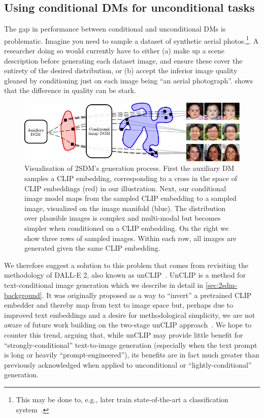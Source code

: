 \subsection{Using conditional DMs for unconditional tasks} \label{sec:2sdm-2sdm-method}

The gap in performance between conditional and unconditional DMs is problematic. Imagine you need to sample a dataset of synthetic aerial photos.\footnote{ This may be done to, e.g., later train state-of-the-art a classification system~\citep{azizi2023synthetic}.}. A researcher doing so would currently have to either (a) make up a scene description before generating each dataset image, and ensure these cover the entirety of the desired distribution, or (b) accept the inferior image quality gleaned by conditioning just on each image being ``an aerial photograph''.   shows that the difference in quality can be stark.

\begin{figure}[t]
    \centering
    \includegraphics[width=\textwidth]{figs/2sdm/vcdm-diagram.pdf}
    \caption{Visualisation of 2SDM's generation process. First the auxiliary DM samples a CLIP embedding, corresponding to a cross in the space of CLIP embeddings (red) in our illustration. Next, our conditional image model maps from the sampled CLIP embedding to a sampled image, visualized on the image manifold (blue). The distribution over plausible images is complex and multi-modal but becomes simpler when conditioned on a CLIP embedding. On the right we show three rows of sampled images. Within each row, all images are generated given the same CLIP embedding.}
    \label{fig:samples}
\end{figure}

We therefore suggest a solution to this problem that comes from revisiting the methodology of DALL-E 2, also known as unCLIP~\citep{ramesh2022hierarchical}. UnCLIP is a method for text-conditional image generation which we describe in detail in \cref{sec:2sdm-background}. It was originally proposed as a way to ``invert'' a pretrained CLIP embedder and thereby map from text to image space but, perhaps due to improved text embeddings and a desire for methodological simplicity, we are not aware of future work building on the two-stage unCLIP approach~\citep{rombach2022high,chang2023muse,hoogeboom2023simple}. We hope to counter this trend, arguing that, while unCLIP may provide little benefit for ``strongly-conditional'' text-to-image generation (especially when the text prompt is long or heavily ``prompt-engineered''), its benefits are in fact much greater than previously acknowledged when applied to unconditional or ``lightly-conditional'' generation.

